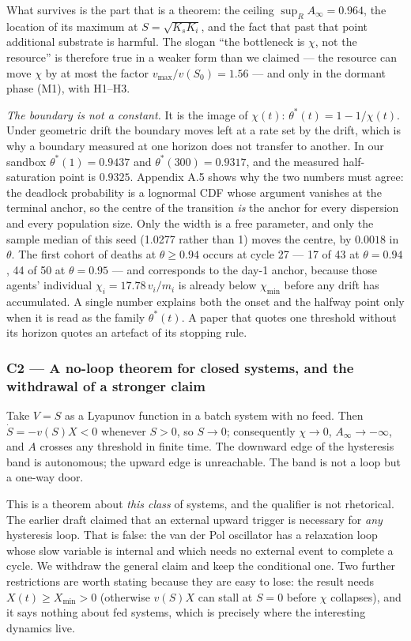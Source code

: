 \documentclass[11pt,a4paper]{article}
\begin{document}
What survives is the part that is a theorem: the ceiling \(\sup_R A_\infty=0.964\),
the location of its maximum at \(S=\sqrt{K_sK_i}\), and the fact that past that
point additional substrate is harmful. The slogan ``the bottleneck is \(\chi\), not
the resource'' is therefore true in a weaker form than we claimed --- the resource can
move \(\chi\) by at most the factor \(v_{\max}/v(S_0)=1.56\) --- and only in the dormant
phase (M1), with H1--H3.

\emph{The boundary is not a constant.} It is the image of \(\chi(t)\):
\(\theta^\ast(t)=1-1/\chi(t)\). Under geometric drift the boundary moves left at a
rate set by the drift, which is why a boundary measured at one horizon does not
transfer to another. In our sandbox \(\theta^\ast(1)=0.9437\) and
\(\theta^\ast(300)=0.9317\), and the measured half-saturation point is \(0.9325\).
Appendix A.5 shows why the two numbers must agree: the deadlock probability is a
lognormal CDF whose argument vanishes at the terminal anchor, so the centre of the
transition \emph{is} the anchor for every dispersion and every population size. Only
the width is a free parameter, and only the sample median of this seed (1.0277
rather than 1) moves the centre, by \(0.0018\) in \(\theta\). The first cohort of
deaths at \(\theta\ge0.94\) occurs at cycle 27 --- 17 of 43 at \(\theta=0.94\), 44 of 50
at \(\theta=0.95\) --- and corresponds to the day-1 anchor, because those agents'
individual \(\chi_i=17.78\,v_i/m_i\) is already below \(\chi_{\min}\) before any
drift has accumulated. A single number explains both the onset and the halfway
point only when it is read as the family \(\theta^\ast(t)\). A paper that quotes
one threshold without its horizon quotes an artefact of its stopping rule.

\subsubsection{C2 --- A no-loop theorem for closed systems, and the withdrawal of a stronger claim}\label{c2-a-no-loop-theorem-for-closed-systems-and-the-withdrawal-of-a-stronger-claim}

Take \(V=S\) as a Lyapunov function in a batch system with no feed. Then
\(\dot S=-v(S)X<0\) whenever \(S>0\), so \(S\to0\); consequently \(\chi\to0\),
\(A_\infty\to-\infty\), and \(A\) crosses any threshold in finite time. The downward
edge of the hysteresis band is autonomous; the upward edge is unreachable. The
band is not a loop but a one-way door.

This is a theorem about \emph{this class} of systems, and the qualifier is not
rhetorical. The earlier draft claimed that an external upward trigger is
necessary for \emph{any} hysteresis loop. That is false: the van der Pol oscillator
\cite{vanderpol1926} has a relaxation loop whose slow variable is internal and
which needs no external event to complete a cycle. We withdraw the general claim and keep the
conditional one. Two further restrictions are worth stating because they are
easy to lose: the result needs \(X(t)\ge X_{\min}>0\) (otherwise \(v(S)X\) can stall
at \(S=0\) before \(\chi\) collapses), and it says nothing about fed systems, which
is precisely where the interesting dynamics live.
\end{document}

